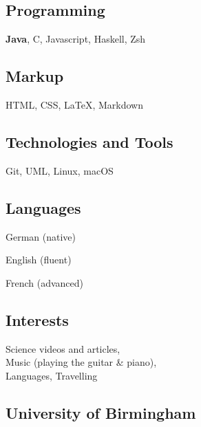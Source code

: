 \documentclass[]{jonas-cv}
\begin{document}
\begin{minipage}[t]{0.33\textwidth} 


\tinysectionsep
\subsection{Programming}
\textbf{Java}, C, Javascript, Haskell, Zsh
\sectionsep

\subsection{Markup}
HTML, CSS, \LaTeX, Markdown
\sectionsep

\subsection{Technologies and Tools}
Git, UML, Linux, macOS
\sectionsep

\subsection{Languages}
\tinysectionsep
\tinysectionsep
\begin{tightemize}
    \item German (native)
    \item English (fluent)
    \item French (advanced)
\end{tightemize}
\sectionsep

\subsection{Interests}
Science videos and articles,\\
Music (playing the guitar \& piano),\\
Languages, Travelling
\largesectionsep

\tinysectionsep
\vspace{0.25mm}
\subsection{University of Birmingham}
\sectionsep


\end{minipage}
\end{document}

